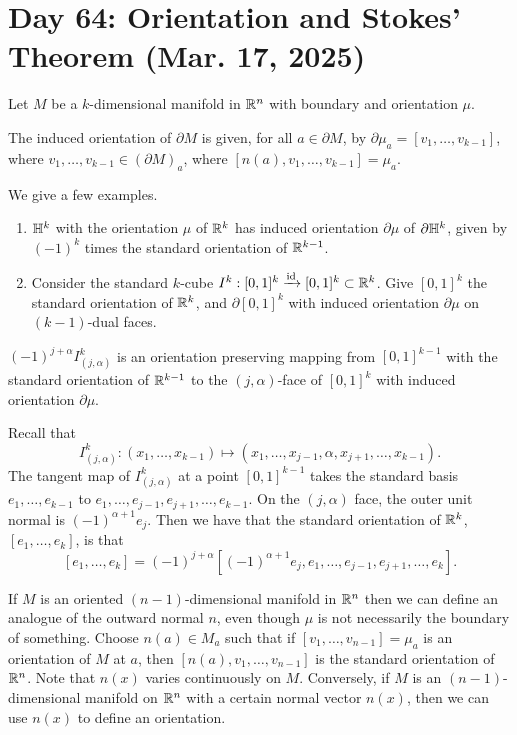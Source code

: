 \section{Day 64: Orientation and Stokes' Theorem (Mar. 17, 2025)}
Let $M$ be a $k$-dimensional manifold in $\mathbb R^n$ with boundary and orientation $\mu$.
\begin{definition}
    The induced orientation of $\partial M$ is given, for all $a \in \partial M$, by $\partial \mu_a = [v_1, \dots, v_{k-1}]$, where $v_1, \dots, v_{k-1} \in (\partial M)_a$, where $[n(a), v_1, \dots, v_{k-1}] = \mu_a$. 
\end{definition}
\noindent We give a few examples.
\begin{enumerate}[label=(\alph*)]
    \item $\mathbb H^k$ with the orientation $\mu$ of $\mathbb R^k$ has induced orientation $\partial \mu$ of $\partial \mathbb H^k$, given by $(-1)^k$ times the standard orientation of $\mathbb R^{k-1}$.
    \item Consider the standard $k$-cube $I^k : [0, 1]^k \xrightarrow[]{\mathrm{id}} [0, 1]^k \subset \mathbb R^k$. Give $[0, 1]^k$ the standard orientation of $\mathbb R^k$, and $\partial [0, 1]^k$ with induced orientation $\partial \mu$ on $(k-1)$-dual faces.
\end{enumerate}
\begin{simpleclaim}
    $(-1)^{j + \alpha} I_{(j, \alpha)}^k$ is an orientation preserving mapping from $[0, 1]^{k-1}$ with the standard orientation of $\mathbb R^{k-1}$ to the $(j, \alpha)$-face of $[0, 1]^k$ with induced orientation $\partial \mu$.
\end{simpleclaim}
\noindent Recall that
\[ I^k_{(j, \alpha)} : (x_1, \dots, x_{k-1}) \mapsto (x_1, \dots, x_{j-1}, \alpha, x_{j+1}, \dots, x_{k-1}). \]
The tangent map of $I^k_{(j, \alpha)}$ at a point $[0, 1]^{k-1}$ takes the standard basis $e_1, \dots, e_{k-1}$ to $e_1, \dots, e_{j-1}, e_{j+1}, \dots, e_{k-1}$. On the $(j, \alpha)$ face, the outer unit normal is $(-1)^{\alpha + 1} e_j$. Then we have that the standard orientation of $\mathbb R^k$, $[e_1, \dots, e_k]$, is that
\[ [e_1, \dots, e_k] = (-1)^{j+\alpha} \left[(-1)^{\alpha + 1}e_j, e_1, \dots, e_{j-1}, e_{j+1}, \dots, e_{k}\right]. \]
\begin{remark}
    If $M$ is an oriented $(n-1)$-dimensional manifold in $\mathbb R^n$ then we can define an analogue of the outward normal $n$, even though $\mu$ is not necessarily the boundary of something. Choose $n(a) \in M_a$ such that if $[v_1, \dots, v_{n-1}] = \mu_a$ is an orientation of $M$ at $a$, then $[n(a), v_1, \dots, v_{n-1}]$ is the standard orientation of $\mathbb R^n$. Note that $n(x)$ varies continuously on $M$.
    \medskip\newline
    Conversely, if $M$ is an $(n-1)$-dimensional manifold on $\mathbb R^n$ with a certain normal vector $n(x)$, then we can use $n(x)$ to define an orientation.
\end{remark}

